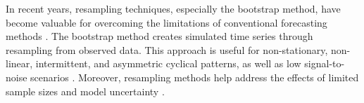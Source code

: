 \documentclass[review,a4paper,fleqn,3p,11pt,authoryear]{elsarticle}
\begin{document}

In recent years, resampling techniques, especially the bootstrap method, have become valuable for overcoming the limitations of conventional forecasting methods \citep{hasni2019spare}. The bootstrap method creates simulated time series through resampling from observed data. This approach is useful for non-stationary, non-linear, intermittent, and asymmetric cyclical patterns, as well as low signal-to-noise scenarios \citep{feliu2024enhancing, kreiss2012bootstrap}. Moreover, resampling methods help address the effects of limited sample sizes \citep{davison1997bootstrap}  and model uncertainty \citep{sarris2020exploiting}. 
\end{document}
